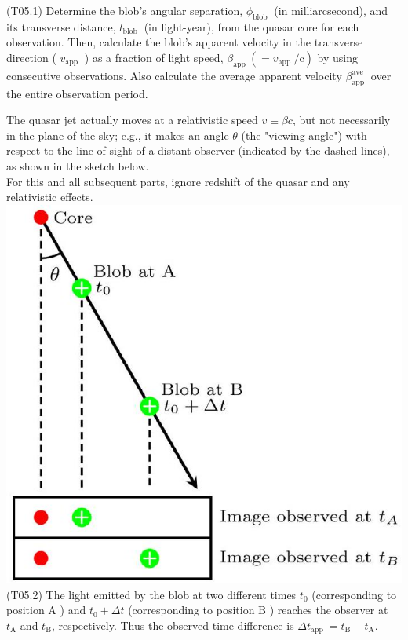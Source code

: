 \documentclass[10pt]{article}
\begin{document}
    (T05.1) Determine the blob's angular separation, $\phi_{\text {blob }}$ (in milliarcsecond), and its transverse distance, $l_{\text {blob }}$ (in light-year), from the quasar core for each observation. Then, calculate the blob's apparent velocity in the transverse direction ( $v_{\text {app }}$ ) as a fraction of light speed, $\beta_{\text {app }}\left(=v_{\text {app }} / \mathrm{c}\right)$ by using consecutive observations. Also calculate the average apparent velocity $\beta_{\text {app }}^{\text {ave }}$ over the entire observation period.
    
    The quasar jet actually moves at a relativistic speed $v \equiv \beta c$, but not necessarily in the plane of the sky; e.g., it makes an angle $\theta$ (the "viewing angle") with respect to the line of sight of a distant observer (indicated by the dashed lines), as shown in the sketch below.\\
    For this and all subsequent parts, ignore redshift of the quasar and any relativistic effects.\\
    \includegraphics[max width=\textwidth, center]{2025_08_23_e94579452776a99c4850g-04}\\
    (T05.2) The light emitted by the blob at two different times $t_{0}$ (corresponding to position A ) and $t_{0}+\Delta t$ (corresponding to position B ) reaches the observer at $t_{\mathrm{A}}$ and $t_{\mathrm{B}}$, respectively. Thus the observed time difference is $\Delta t_{\text {app }}=t_{\mathrm{B}}-t_{\mathrm{A}}$.\\
\end{document}
